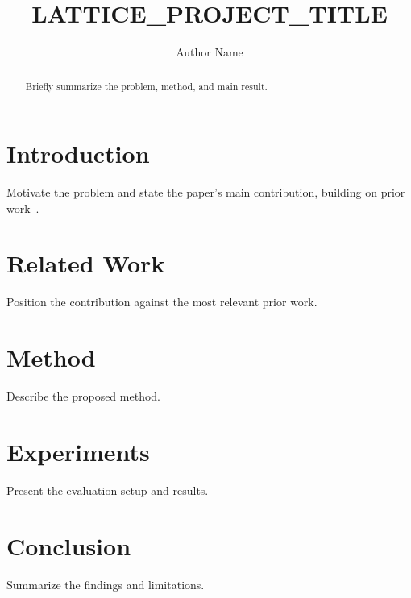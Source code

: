 \documentclass[sigconf]{acmart}
\begin{document}
\title{LATTICE_PROJECT_TITLE}

\author{Author Name}

\begin{abstract}
Briefly summarize the problem, method, and main result.
\end{abstract}



\maketitle

\section{Introduction}
Motivate the problem and state the paper's main contribution, building on
prior work~\cite{acmart,kopka2004guide}.

\section{Related Work}
Position the contribution against the most relevant prior work.

\section{Method}
Describe the proposed method.

\section{Experiments}
Present the evaluation setup and results.

\section{Conclusion}
Summarize the findings and limitations.



\end{document}
